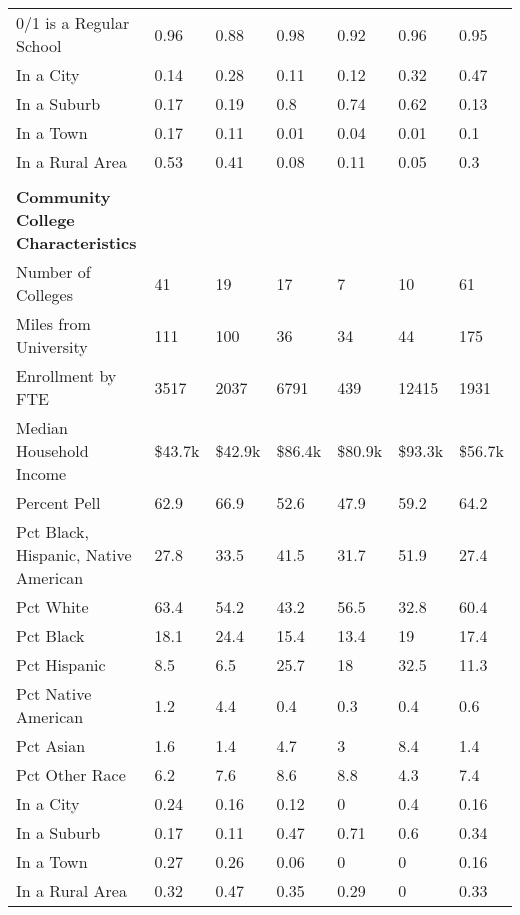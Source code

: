 \begin{longtabu}{X[4.5,l] X[1,c] X[1,c] X[1,c] X[1,c] X[1,c] X[1,c]}
\hspace{0.4cm}0/1 is a Regular School&0.96&0.88&0.98&0.92&0.96&0.95\\%
\hspace{0.4cm}In a City&0.14&0.28&0.11&0.12&0.32&0.47\\%
\hspace{0.4cm}In a Suburb&0.17&0.19&0.8&0.74&0.62&0.13\\%
\hspace{0.4cm}In a Town&0.17&0.11&0.01&0.04&0.01&0.1\\%
\hspace{0.4cm}In a Rural Area&0.53&0.41&0.08&0.11&0.05&0.3\\%
&&&&&&\\%
\textbf{Community College Characteristics}&\textbf{}&\textbf{}&\textbf{}&\textbf{}&\textbf{}&\textbf{}\\%
\hspace{0.4cm}Number of Colleges&41&19&17&7&10&61\\%
\hspace{0.4cm}Miles from University&111&100&36&34&44&175\\%
\hspace{0.4cm}Enrollment by FTE&3517&2037&6791&439&12415&1931\\%
\hspace{0.4cm}Median Household Income&\$43.7k&\$42.9k&\$86.4k&\$80.9k&\$93.3k&\$56.7k\\%
\hspace{0.4cm}Percent Pell&62.9&66.9&52.6&47.9&59.2&64.2\\%
\hspace{0.4cm}Pct Black, Hispanic, Native American&27.8&33.5&41.5&31.7&51.9&27.4\\%
\hspace{0.4cm}Pct White&63.4&54.2&43.2&56.5&32.8&60.4\\%
\hspace{0.4cm}Pct Black&18.1&24.4&15.4&13.4&19&17.4\\%
\hspace{0.4cm}Pct Hispanic&8.5&6.5&25.7&18&32.5&11.3\\%
\hspace{0.4cm}Pct Native American&1.2&4.4&0.4&0.3&0.4&0.6\\%
\hspace{0.4cm}Pct Asian&1.6&1.4&4.7&3&8.4&1.4\\%
\hspace{0.4cm}Pct Other Race&6.2&7.6&8.6&8.8&4.3&7.4\\%
\hspace{0.4cm}In a City&0.24&0.16&0.12&0&0.4&0.16\\%
\hspace{0.4cm}In a Suburb&0.17&0.11&0.47&0.71&0.6&0.34\\%
\hspace{0.4cm}In a Town&0.27&0.26&0.06&0&0&0.16\\%
\hspace{0.4cm}In a Rural Area&0.32&0.47&0.35&0.29&0&0.33\\%
\end{longtabu}
